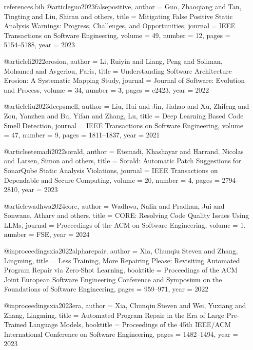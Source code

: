 \begin{filecontents*}[overwrite]{references.bib}
@article{guo2023falsepositive,
  author  = {Guo, Zhaoqiang and Tan, Tingting and Liu, Shiran and others},
  title   = {Mitigating False Positive Static Analysis Warnings: Progress, Challenges, and Opportunities},
  journal = {IEEE Transactions on Software Engineering},
  volume  = {49},
  number  = {12},
  pages   = {5154--5188},
  year    = {2023}
}

@article{li2022erosion,
  author  = {Li, Ruiyin and Liang, Peng and Soliman, Mohamed and Avgeriou, Paris},
  title   = {Understanding Software Architecture Erosion: A Systematic Mapping Study},
  journal = {Journal of Software: Evolution and Process},
  volume  = {34},
  number  = {3},
  pages   = {e2423},
  year    = {2022}
}

@article{liu2023deepsmell,
  author  = {Liu, Hui and Jin, Jiahao and Xu, Zhifeng and Zou, Yanzhen and Bu, Yifan and Zhang, Lu},
  title   = {Deep Learning Based Code Smell Detection},
  journal = {IEEE Transactions on Software Engineering},
  volume  = {47},
  number  = {9},
  pages   = {1811--1837},
  year    = {2021}
}

@article{etemadi2022sorald,
  author  = {Etemadi, Khashayar and Harrand, Nicolas and Larsen, Simon and others},
  title   = {Sorald: Automatic Patch Suggestions for SonarQube Static Analysis Violations},
  journal = {IEEE Transactions on Dependable and Secure Computing},
  volume  = {20},
  number  = {4},
  pages   = {2794--2810},
  year    = {2023}
}

@article{wadhwa2024core,
  author  = {Wadhwa, Nalin and Pradhan, Jui and Sonwane, Atharv and others},
  title   = {CORE: Resolving Code Quality Issues Using LLMs},
  journal = {Proceedings of the ACM on Software Engineering},
  volume  = {1},
  number  = {FSE},
  year    = {2024}
}

@inproceedings{xia2022alpharepair,
  author    = {Xia, Chunqiu Steven and Zhang, Lingming},
  title     = {Less Training, More Repairing Please: Revisiting Automated Program Repair via Zero-Shot Learning},
  booktitle = {Proceedings of the ACM Joint European Software Engineering Conference and Symposium on the Foundations of Software Engineering},
  pages     = {959--971},
  year      = {2022}
}

@inproceedings{xia2023era,
  author    = {Xia, Chunqiu Steven and Wei, Yuxiang and Zhang, Lingming},
  title     = {Automated Program Repair in the Era of Large Pre-Trained Language Models},
  booktitle = {Proceedings of the 45th IEEE/ACM International Conference on Software Engineering},
  pages     = {1482--1494},
  year      = {2023}
}


\end{filecontents*}

